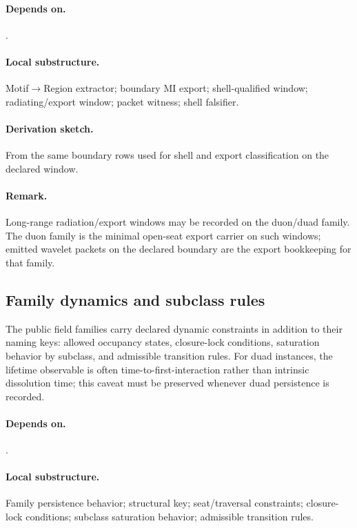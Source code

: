 \paragraph{Depends on.} .
\paragraph{Local substructure.} Motif$\to$Region extractor; boundary MI export; shell-qualified window; radiating/export window; packet witness; shell falsifier.
\paragraph{Derivation sketch.} From the same boundary rows used for shell and export classification on the declared window.
\paragraph{Remark.} Long-range radiation/export windows may be recorded on the duon/duad family. The duon family is the minimal open-seat export carrier on such windows; emitted wavelet packets on the declared boundary are the export bookkeeping for that family.

\subsection{Family dynamics and subclass rules}\label{subsec:family-dynamics-subclass}
\begin{definition}
\label{def:family-dynamics-operator}
The public field families carry declared dynamic constraints in addition to their naming keys: allowed occupancy states, closure-lock conditions, saturation behavior by subclass, and admissible transition rules. For duad instances, the lifetime observable is often time-to-first-interaction rather than intrinsic dissolution time; this caveat must be preserved whenever duad persistence is recorded.
\end{definition}

\paragraph{Depends on.} .
\paragraph{Local substructure.} Family persistence behavior; structural key; seat/traversal constraints; closure-lock conditions; subclass saturation behavior; admissible transition rules.
